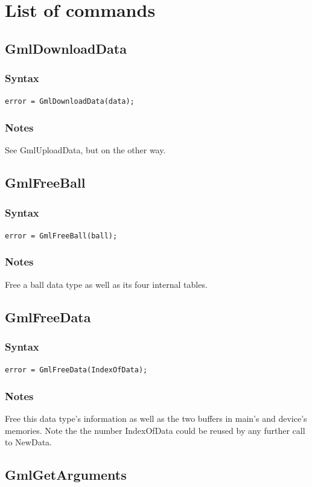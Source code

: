 \documentclass[a4paper,12pt]{article}
\begin{document}
%
%

\section{List of commands}


\subsection{GmlDownloadData}
\subsubsection*{Syntax}
{\tt error = GmlDownloadData(data);}
\subsubsection*{Notes}
See GmlUploadData, but on the other way.


\subsection{GmlFreeBall}
\subsubsection*{Syntax}
{\tt error = GmlFreeBall(ball);}
\subsubsection*{Notes}
Free a ball data type as well as its four internal tables.


\subsection{GmlFreeData}
\subsubsection*{Syntax}
{\tt error = GmlFreeData(IndexOfData);}
\subsubsection*{Notes}
Free this data type's information as well as the two buffers in main's and device's memories. Note the the number IndexOfData could be reused by any further call to NewData.


\subsection{GmlGetArguments}
\end{document}
